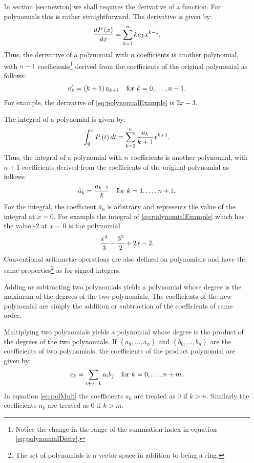 In section \ref{sec:newton} we shall requires the derivative of a
function. For polynomials this is rather straightforward. The
derivative is given by:
\begin{equation}
\label{eq:polynomialDeriv}{dP\left(x\right)\over
dx}=\sum_{k=1}^{n}k a_k x^{k-1}.
\end{equation}
Thus, the derivative of a polynomial with $n$ coefficients is
another polynomial, with $n-1$ coefficients\footnote{Notice the
change in the range of the summation index in equation
\ref{eq:polynomialDeriv}.} derived from the coefficients of the
original polynomial as follows:
\begin{equation}
a^\prime _k=\left(k+1\right)a_{k+1}\mbox{\quad for
$k=0,\ldots,n-1$}.
\end{equation}
For example, the derivative of \ref{eq:polynomialExample} is
$2x-3$.

The integral of a polynomial is given by:
\begin{equation}
\int_0^xP\left(t\right)dt=\sum_{k=0}^{n}{a_k \over k+1} x^{k+1}.
\end{equation}
Thus, the integral of a polynomial with $n$ coefficients is
another polynomial, with $n+1$  coefficients derived from the
coefficients of the original polynomial as follows:
\begin{equation}
\bar{a}_k={a_{k-1}\over k}\mbox{\quad for $k=1,\ldots,n+1$}.
\end{equation}
For the integral, the coefficient $\bar{a}_0$ is arbitrary and
represents the value of the integral at $x=0$. For example the
integral of \ref{eq:polynomialExample} which has the value -2 at
$x=0$ is the polynomial
\begin{equation}
{x^3\over 3}-{3 ^2\over2}+2x-2.
\end{equation}
Conventional arithmetic operations are also defined on polynomials
and have the same properties\footnote{The set of polynomials is a
vector space in addition to being a ring.} as for signed integers.

Adding or subtracting two polynomials yields a polynomial whose
degree is the maximum of the degrees of the two polynomials. The
coefficients of the new polynomial are simply the addition or
subtraction of the coefficients of same order.

Multiplying two polynomials yields a polynomial whose degree is
the product of the degrees of the two polynomials. If $\left\{
a_0,\ldots,a_n \right\}$ and $\left\{ b_0,\ldots,b_n \right\}$ are
the coefficients of two polynomials, the coefficients of the
product polynomial are given by:
\begin{equation}
\label{eq:polMult} c_k = \sum_{i+j=k}a_i b_j \mbox{\quad for
$k=0,\ldots,n+m$}.
\end{equation}
In equation \ref{eq:polMult} the coefficients $a_k$ are treated as
0 if $k>n$. Similarly the coefficients $n_k$ are treated as 0 if
$k>m$.

